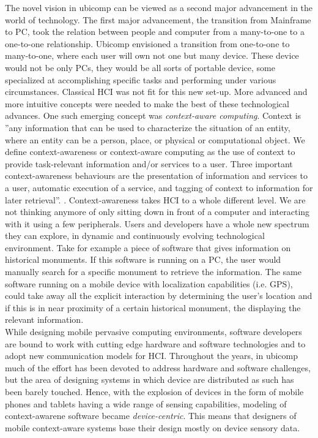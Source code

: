 The novel vision in ubicomp can be viewed as a second major advancement in the world of technology. The first major advancement, the transition from Mainframe to PC, took the relation between people and computer from a many-to-one to a one-to-one relationship. Ubicomp envisioned a transition from one-to-one to many-to-one, where each user will own not one but many device. These device would not be only PCs, they would be all sorts of portable device, some specialized at accomplishing specific tasks and performing under various circumstances. Classical HCI was not fit for this new set-up. More advanced and more intuitive concepts were needed to make the best of these technological advances. One such emerging concept was \emph{context-aware computing}. Context is ''any information that can be used to characterize the situation of an entity, where an entity can be a person, place, or physical or computational object. We define context-awareness or context-aware computing as the use of context to provide task-relevant information and/or services to a user. Three important context-awareness behaviours are the presentation of information and services to a user, automatic execution of a service, and tagging of context to information for later retrieval''. \cite{abowd1999towards}. Context-awareness takes HCI to a whole different level. We are not thinking anymore of only sitting down in front of a computer and interacting with it using a few peripherals. Users and developers have a whole new spectrum they can explore, in dynamic and continuously evolving technological environment. Take for example a piece of software that gives information on historical monuments. If this software is running on a PC, the user would manually search for a specific monument to retrieve the information. The same software running on a mobile device with localization capabilities (i.e. GPS), could take away all the explicit interaction by determining the user's location and if this is in near proximity of a certain historical monument, the displaying the relevant information.\\

While designing mobile pervasive computing environments, software developers are bound to work with cutting edge hardware and software technologies and to adopt new communication models for HCI. Throughout the years, in ubicomp much of the effort has been devoted to address hardware and software challenges, but the area of designing systems in which device are distributed as such has been barely touched. Hence, with the explosion of devices in the form of mobile phones and tablets having a wide range of sensing capabilities, modeling of context-awarene software became \emph{device-centric}. This means that designers of mobile context-aware systems base their design mostly on device sensory data.\\

